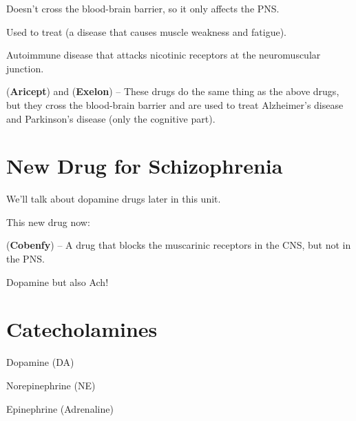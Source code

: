 \begin{coloredlist}
\begin{coloredlist}
\begin{coloredlist}
            \begin{coloredlist}
                \item Doesn't cross the blood-brain barrier, so it only affects the PNS.
                \item Used to treat  (a disease that causes muscle weakness and fatigue).
                \begin{coloredlist}
                    \item Autoimmune disease that attacks nicotinic receptors at the neuromuscular junction.
                \end{coloredlist}
            \end{coloredlist}
            \item {} (\textbf{Aricept}) and  (\textbf{Exelon}) -- These drugs do the same thing as the above drugs, but they cross the blood-brain barrier and are used to treat Alzheimer's disease and Parkinson's disease (only the cognitive part).
        \end{coloredlist}
    \end{coloredlist}
\end{coloredlist}

\section{New Drug for Schizophrenia}

\begin{coloredlist}
    \item We'll talk about dopamine drugs later in this unit.
    \item This new drug now:
    \begin{coloredlist}
        \item {} (\textbf{Cobenfy}) -- A drug that blocks the muscarinic receptors in the CNS, but not in the PNS.
        \item Dopamine but also Ach!
    \end{coloredlist}
\end{coloredlist}

\section{Catecholamines}

\begin{coloredlist}
    \item Dopamine (DA)
    \item Norepinephrine (NE)
    \item Epinephrine (Adrenaline)
\end{coloredlist}


